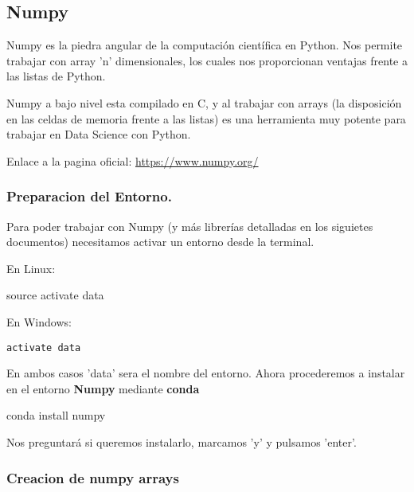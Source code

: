 \documentclass[11pt]{article}
\newenvironment{Shaded}{}{}
\newcommand{\NormalTok}[1]{{#1}}
\newcommand{\BuiltInTok}[1]{{#1}}
\newcommand{\ExtensionTok}[1]{{#1}}
\begin{document}
    \subsection{Numpy}\label{numpy}

Numpy es la piedra angular de la computación científica en Python. Nos
permite trabajar con array 'n' dimensionales, los cuales nos
proporcionan ventajas frente a las listas de Python.

Numpy a bajo nivel esta compilado en C, y al trabajar con arrays (la
disposición en las celdas de memoria frente a las listas) es una
herramienta muy potente para trabajar en Data Science con Python.

Enlace a la pagina oficial: \url{https://www.numpy.org/}

\subsubsection{Preparacion del Entorno.}\label{preparacion-del-entorno.}

Para poder trabajar con Numpy (y más librerías detalladas en los
siguietes documentos) necesitamos activar un entorno desde la terminal.

En Linux:

\begin{Shaded}
\begin{Highlighting}[]
\BuiltInTok{source}\NormalTok{ activate data}
\end{Highlighting}
\end{Shaded}

En Windows:

\begin{verbatim}
activate data
\end{verbatim}

En ambos casos 'data' sera el nombre del entorno. Ahora procederemos a
instalar en el entorno \textbf{Numpy} mediante \textbf{conda}

\begin{Shaded}
\begin{Highlighting}[]
\ExtensionTok{conda}\NormalTok{ install numpy}
\end{Highlighting}
\end{Shaded}

Nos preguntará si queremos instalarlo, marcamos 'y' y pulsamos 'enter'.

\subsubsection{Creacion de numpy arrays}\label{creacion-de-numpy-arrays}
\end{document}
